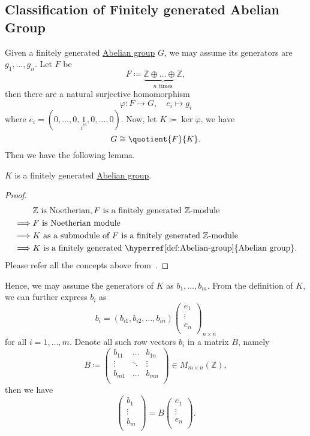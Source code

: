 \subsection{Classification of Finitely generated Abelian Group}
Given a finitely generated \hyperref[def:Abelian-group]{Abelian group} \(G\), we may assume its generators are \(g_1, \dots , g_n \). Let \(F\) be
\[
	F\coloneqq \underbrace{\mathbb{Z} \oplus \dots \oplus \mathbb{Z}  }_{n \text{ times}},
\]
then there are a natural surjective homomorphism
\[
	\varphi \colon F\to G,\quad e_{i} \mapsto g_{i}
\]
where \(e_{i} = (0, \dots , 0, \underset{i^{th} }{1}, 0, \dots , 0  )\). Now, let \(K\coloneqq \ker \varphi  \), we have
\[
	G \cong \quotient{F}{K}.
\]
Then we have the following lemma.
\begin{lemma}
	\(K\) is a finitely generated \hyperref[def:Abelian-group]{Abelian group}.
\end{lemma}
\begin{proof}
	\[
		\begin{split}
			         & \mathbb{Z} \text{ is Noetherian}, F \text{ is a finitely generated \(\mathbb{Z}\)-module } \\
			\implies & F \text{ is Noetherian module}                                                             \\
			\implies & \text{\(K\) as a submodule of \(F\) is a finitely generated \(\mathbb{Z}\)-module }        \\
			\implies & \text{\(K\) is a finitely generated \hyperref[def:Abelian-group]{Abelian group}}.
		\end{split}
	\]
	Please refer all the concepts above from~\cite{atiyah1994introduction}.
\end{proof}

Hence, we may assume the generators of \(K\) as \(b_1, \dots , b_{m}\). From the definition of \(K\), we can further express \(b_{i}\) as
\[
	b_{i} = (b_{i1}, b_{i2}, \dots , b_{in})\begin{pmatrix}
		e_{1}  \\
		\vdots \\
		e_{n}  \\
	\end{pmatrix}_{n \times n}
\]
for all \(i = 1, \dots , m \). Denote all such row vectors \(b_{i} \) in a matrix \(B\), namely
\[
	B \coloneqq \begin{pmatrix}
		b_{11} & \dots  & b_{1n} \\
		\vdots & \ddots & \vdots \\
		b_{m1} & \dots  & b_{mn} \\
	\end{pmatrix}\in M_{m\times n} ({\mathbb{Z} }),
\]
then we have
\[
	\begin{pmatrix}
		b_1    \\
		\vdots \\
		b_m    \\
	\end{pmatrix} = B\begin{pmatrix}
		e_{1}  \\
		\vdots \\
		e_{n}  \\
	\end{pmatrix}.
\]

